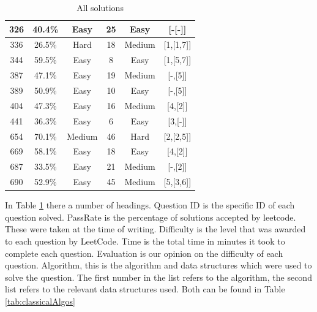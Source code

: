 \documentclass[10pt,twocolumn]{IEEEtran}
\begin{document}
\begin{table}[t]
\begin{tabular}{|c| c| c| c| c| c|}
  	\hline
 	326 & 40.4\% &Easy  &25  &Easy&[-[-]]\\
   	\hline
  	336 & 26.5\% &Hard &18  &Medium&[1,[1,7]]\\
  	\hline
 	344 & 59.5\% &Easy  &8  &Easy&[1,[5,7]]\\
  	\hline
 	387 & 47.1\% &Easy  & 19 &Medium&[-,[5]]\\
  	\hline
 	389 & 50.9\% &Easy  & 10 &Easy& [-,[5]]\\
  	\hline
 	404 & 47.3\% &Easy  &16  &Medium&[4,[2]]\\
	\hline
 	441 & 36.3\% &Easy  &6&Easy &[3,[-]]\\ 	
  	\hline
 	654 & 70.1\% &Medium  &46  &Hard&[2,[2,5]]\\
  	\hline
	669 &  58.1\%& Easy &18  &Easy&[4,[2]]\\
  	\hline
	687 &  33.5\%& Easy &21  &Medium&[-,[2]]\\
  	\hline
 	690 &  52.9\%& Easy &   45&Medium&[5,[3,6]]\\[1ex]
 	\hline
\end{tabular}
\caption{All solutions}
\label{tab:tabSols}
\end{table}
\par In Table \ref{tab:tabSols} there a number of headings. Question ID is the specific ID of each question solved. PassRate is the percentage of solutions accepted by leetcode. These were taken at the time of writing. Difficulty is the level that was awarded to each question by LeetCode. Time is the total time in minutes it took to complete each question. Evaluation is our opinion on the difficulty of each question. Algorithm, this is the algorithm and data structures which were used to solve the question. The first number in the list refers to the algorithm, the second list refers to the relevant data structures used. Both can be found in Table {\ref{tab:classicalAlgos}}
\end{document}
